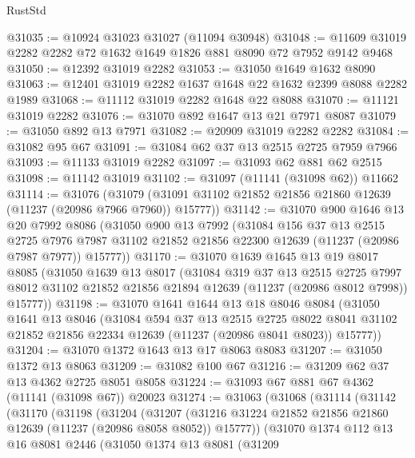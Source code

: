 \begin{lexlean}{RustStd}
\begin{coremodule}
@31035 := @10924 @31023 @31027 (@11094 @30948)
@31048 := @11609 @31019 @2282 @2282 @72 @1632 @1649 @1826 @881 @8090 @72 @7952 @9142 @9468
@31050 := @12392 @31019 @2282
@31053 := @31050 @1649 @1632 @8090
@31063 := @12401 @31019 @2282 @1637 @1648 @22 @1632 @2399 @8088 @2282 @1989
@31068 := @11112 @31019 @2282 @1648 @22 @8088
@31070 := @11121 @31019 @2282
@31076 := @31070 @892 @1647 @13 @21 @7971 @8087
@31079 := @31050 @892 @13 @7971
@31082 := @20909 @31019 @2282 @2282
@31084 := @31082 @95 @67
@31091 := @31084 @62 @37 @13 @2515 @2725 @7959 @7966
@31093 := @11133 @31019 @2282
@31097 := @31093 @62 @881 @62 @2515
@31098 := @11142 @31019
@31102 := @31097 (@11141 (@31098 @62)) @11662
@31114 := @31076
    (@31079 (@31091 @31102 @21852 @21856 @21860 @12639 (@11237 (@20986 @7966 @7960)) @15777))
@31142 := @31070
    @900
    @1646
    @13
    @20
    @7992
    @8086
    (@31050
      @900
      @13
      @7992
      (@31084
        @156
        @37
        @13
        @2515
        @2725
        @7976
        @7987
        @31102
        @21852
        @21856
        @22300
        @12639
        (@11237 (@20986 @7987 @7977))
        @15777))
@31170 := @31070
    @1639
    @1645
    @13
    @19
    @8017
    @8085
    (@31050
      @1639
      @13
      @8017
      (@31084
        @319
        @37
        @13
        @2515
        @2725
        @7997
        @8012
        @31102
        @21852
        @21856
        @21894
        @12639
        (@11237 (@20986 @8012 @7998))
        @15777))
@31198 := @31070
    @1641
    @1644
    @13
    @18
    @8046
    @8084
    (@31050
      @1641
      @13
      @8046
      (@31084
        @594
        @37
        @13
        @2515
        @2725
        @8022
        @8041
        @31102
        @21852
        @21856
        @22334
        @12639
        (@11237 (@20986 @8041 @8023))
        @15777))
@31204 := @31070 @1372 @1643 @13 @17 @8063 @8083
@31207 := @31050 @1372 @13 @8063
@31209 := @31082 @100 @67
@31216 := @31209 @62 @37 @13 @4362 @2725 @8051 @8058
@31224 := @31093 @67 @881 @67 @4362 (@11141 (@31098 @67)) @20023
@31274 := @31063
    (@31068
      (@31114
        (@31142
          (@31170
            (@31198
              (@31204
                (@31207
                  (@31216 @31224 @21852 @21856 @21860 @12639 (@11237 (@20986 @8058 @8052)) @15777))
                (@31070
                  @1374
                  @112
                  @13
                  @16
                  @8081
                  @2446
                  (@31050
                    @1374
                    @13
                    @8081
                    (@31209

\end{coremodule}
\end{lexlean}
